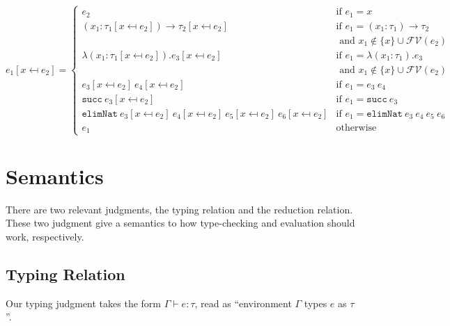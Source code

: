 \documentclass[12pt]{article}
\begin{document}
\begin{equation*}
e_1[x \mapsfrom e_2] = \begin{cases}
e_2 & \text{if } e_1 = x \\
(x_1 : \tau_1[x \mapsfrom e_2]) \rightarrow \tau_2[x \mapsfrom e_2]
   &\text{if } e_1 = (x_1 : \tau_1) \rightarrow \tau_2 \\
   &\text{ and } x_1 \not \in \{x\} \cup \mathcal{FV}(e_2) \\
\lambda (x_1 : \tau_1[x \mapsfrom e_2]). e_3[x \mapsfrom e_2]
   &\text{if } e_1 = \lambda (x_1 : \tau_1). e_3 \\
   &\text{ and } x_1 \not \in \{x\} \cup \mathcal{FV}(e_2) \\
e_3[x \mapsfrom e_2]\ e_4[x \mapsfrom e_2] & \text{if } e_1 = e_3\ e_4 \\
\mathtt{succ}\ e_3[x \mapsfrom e_2] & \text{if } e_1 = \mathtt{succ}\ e_3 \\
\mathtt{elimNat}
  \ e_3[x \mapsfrom e_2]
  \ e_4[x \mapsfrom e_2]
  \ e_5[x \mapsfrom e_2]
  \ e_6[x \mapsfrom e_2]
  & \text{if } e_1 = \mathtt{elimNat}\ e_3\ e_4\ e_5\ e_6 \\
e_1 & \text{otherwise}
\end{cases}
\end{equation*}

\section*{Semantics}
\label{sec:org066ebfe}

There are two relevant judgments, the typing relation and the reduction relation. These two judgment give a semantics to how type-checking and evaluation should work, respectively.

\subsection*{Typing Relation}
\label{sec:org04f4304}

Our typing judgment takes the form \(\boxed{\Gamma \vdash e : \tau}\), read as ``environment \(\Gamma\) types \(e\) as \(\tau\)''. 
\end{document}
